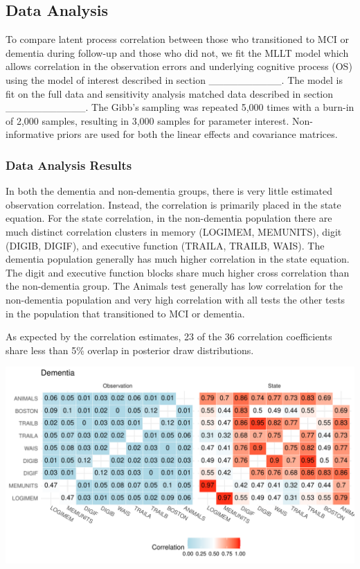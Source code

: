 \documentclass[
]{article}
\author{}
\date{\vspace{-2.5em}}
\begin{document}
\hypertarget{data-analysis}{%
\subsection{Data Analysis}\label{data-analysis}}

To compare latent process correlation between those who transitioned to MCI or dementia during follow-up and those who did not, we fit the MLLT model which allows correlation in the observation errors and underlying cognitive process (OS) using the model of interest described in section \_\_\_\_\_\_\_\_\_\_. The model is fit on the full data and sensitivity analysis matched data described in section \_\_\_\_\_\_\_\_\_\_\_. The Gibb's sampling was repeated 5,000 times with a burn-in of 2,000 samples, resulting in 3,000 samples for parameter interest. Non-informative priors are used for both the linear effects and covariance matrices.

\hypertarget{data-analysis-results}{%
\subsubsection{Data Analysis Results}\label{data-analysis-results}}

In both the dementia and non-dementia groups, there is very little estimated observation correlation. Instead, the correlation is primarily placed in the state equation. For the state correlation, in the non-dementia population there are much distinct correlation clusters in memory (LOGIMEM, MEMUNITS), digit (DIGIB, DIGIF), and executive function (TRAILA, TRAILB, WAIS). The dementia population generally has much higher correlation in the state equation. The digit and executive function blocks share much higher cross correlation than the non-dementia group. The Animals test generally has low correlation for the non-dementia population and very high correlation with all tests the other tests in the population that transitioned to MCI or dementia.

As expected by the correlation estimates, 23 of the 36 correlation coefficients share less than 5\% overlap in posterior draw distributions.

\includegraphics{DataAnalysis_files/figure-latex/unnamed-chunk-3-1.pdf}
\end{document}
